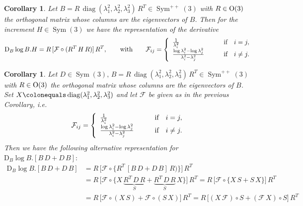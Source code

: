\documentclass[10pt]{article}
\newcounter{theoremCounter}
\numberwithin{theoremCounter}{section}
\theoremstyle{plain}
\newtheorem{cor}[theoremCounter]{Corollary}
\theoremstyle{definition}
\newcommand{\OO}{{\rm O}}
\newcommand{\DD}{\mathrm{D}}
\DeclareMathOperator{\diag}{diag}
\DeclareMathOperator{\Sym}{Sym}
\numberwithin{equation}{section}
\begin{document}
\begin{appendix}
\begin{cor}
	Let $B = R \, \diag(\lambda_1^2, \lambda_2^2, \lambda_3^2) \, R^T \in \Sym^{++}(3)$ with $R \in \OO(3)$ the orthogonal matrix whose columns are the eigenvectors of $B$. Then for the increment $H \in \Sym(3)$ we have the representation of the derivative
		\begin{align}
		\DD_B \log B . H = R \, [\mathcal{F} \circ (R^T \, H \, R)] \, R^T, \qquad \textnormal{with} \qquad \mathcal{F}_{ij} = \left\{
			\begin{array}{ll}
			\frac{1}{\lambda_i^2} &\qquad \textnormal{if} \quad i = j, \\
			\frac{\log \lambda_i^2 - \log \lambda_j^2}{\lambda_i^2 - \lambda_j^2} &\qquad \textnormal{if} \quad i \neq j.
			\end{array}
		\right.
		\end{align}
	\end{cor}
%
	\begin{cor}
	\label{dopeasscor001}
	Let $D \in \Sym(3), \, B = R \, \diag(\lambda_1^2, \lambda_2^2, \lambda_3^2) \, R^T \in \Sym^{++}(3)$ with $R \in \OO(3)$ the orthogonal matrix whose columns are the eigenvectors of $B$. Set $X\colonequals \diag(\lambda_1^2, \lambda_2^2, \lambda_3^2)$ and let $\mathcal{F}$ be given as in the previous Corollary, i.e.
		\begin{align}
		\mathcal{F}_{ij} = \left\{
			\begin{array}{ll}
			\frac{1}{\lambda_i^2} &\qquad \textnormal{if} \quad i = j, \\
			\frac{\log \lambda_i^2 - \log \lambda_j^2}{\lambda_i^2 - \lambda_j^2} &\qquad \textnormal{if} \quad i \neq j.
			\end{array}
		\right.
		\end{align}
	Then we have the following alternative representation for $\DD_B \log B . [B \, D + D \, B]:$
		\begin{equation}
		\label{eqappendixowncalc001}
		\begin{alignedat}{2}
		\DD_B \log B . [B \, D + D \, B] &= R \, \big[\mathcal{F} \circ \{R^T \, [B \, D + D \, B] \, R)\}\big] \, R^T \\
		&= R \, \big[ \mathcal{F} \circ \{ X \, \underbrace{R^T \, D \, R}_{S} + \underbrace{R^T \, D \, R}_S \, X\} \big] \, R^T = R \, \big[ \mathcal{F} \circ \{ X \, S + S \, X\} \big] \, R^T \\
		&= R \, \big[ \mathcal{F} \circ (X \, S) + \mathcal{F} \circ (S \, X) \big] \, R^T = R \, \big[ (X \, \mathcal{F}) \circ S + (\mathcal{F} \, X) \circ S \big] \, R^T \\

\end{alignedat}
\end{equation}
\end{cor}
\end{appendix}
\end{document}
